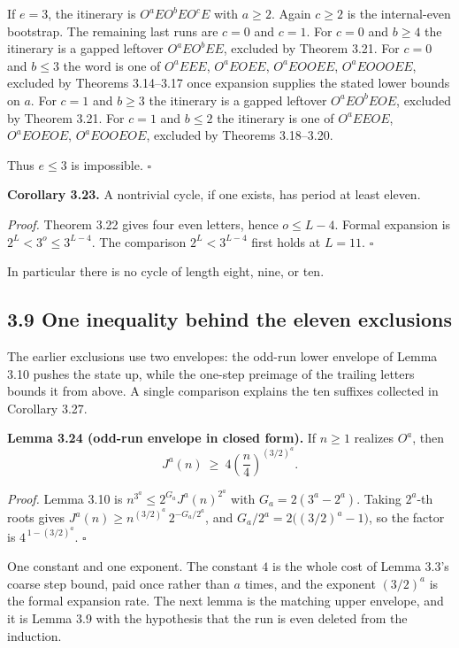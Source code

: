 \documentclass[12pt]{article}
\begin{document}
If \(e=3\), the itinerary is \(O^aEO^bEO^cE\) with \(a\ge 2\). Again
\(c\ge 2\) is the internal-even bootstrap. The remaining last runs are
\(c=0\) and \(c=1\). For \(c=0\) and \(b\ge 4\) the itinerary is a
gapped leftover \(O^aEO^bEE\), excluded by Theorem 3.21. For \(c=0\) and
\(b\le 3\) the word is one of \(O^aEEE\), \(O^aEOEE\), \(O^aEOOEE\),
\(O^aEOOOEE\), excluded by Theorems 3.14--3.17 once expansion supplies
the stated lower bounds on \(a\). For \(c=1\) and \(b\ge 3\) the
itinerary is a gapped leftover \(O^aEO^bEOE\), excluded by Theorem 3.21.
For \(c=1\) and \(b\le 2\) the itinerary is one of \(O^aEEOE\),
\(O^aEOEOE\), \(O^aEOOEOE\), excluded by Theorems 3.18--3.20.

Thus \(e\le 3\) is impossible. \(\square\)

\textbf{Corollary 3.23.} A nontrivial cycle, if one exists, has period
at least eleven.

\emph{Proof.} Theorem 3.22 gives four even letters, hence \(o\le L-4\).
Formal expansion is \(2^L<3^o\le 3^{L-4}\). The comparison
\(2^L<3^{L-4}\) first holds at \(L=11\). \(\square\)

In particular there is no cycle of length eight, nine, or ten.

\subsection{3.9 One inequality behind the eleven
exclusions}\label{one-inequality-behind-the-eleven-exclusions}

The earlier exclusions use two envelopes: the odd-run lower envelope of
Lemma 3.10 pushes the state up, while the one-step preimage of the
trailing letters bounds it from above. A single comparison explains the
ten suffixes collected in Corollary 3.27.

\textbf{Lemma 3.24 (odd-run envelope in closed form).} If \(n\ge 1\)
realizes \(O^a\), then \[
J^a(n)\ \ge\ 4\left(\frac n4\right)^{(3/2)^a}.
\]

\emph{Proof.} Lemma 3.10 is \(n^{3^a}\le 2^{G_a}J^a(n)^{2^a}\) with
\(G_a=2(3^a-2^a)\). Taking \(2^a\)-th roots gives
\(J^a(n)\ge n^{(3/2)^a}\,2^{-G_a/2^a}\), and
\(G_a/2^a=2\bigl((3/2)^a-1\bigr)\), so the factor is
\(4^{\,1-(3/2)^a}\). \(\square\)

One constant and one exponent. The constant \(4\) is the whole cost of
Lemma 3.3's coarse step bound, paid once rather than \(a\) times, and
the exponent \((3/2)^a\) is the formal expansion rate. The next lemma is
the matching upper envelope, and it is Lemma 3.9 with the hypothesis
that the run is even deleted from the induction.
\end{document}
